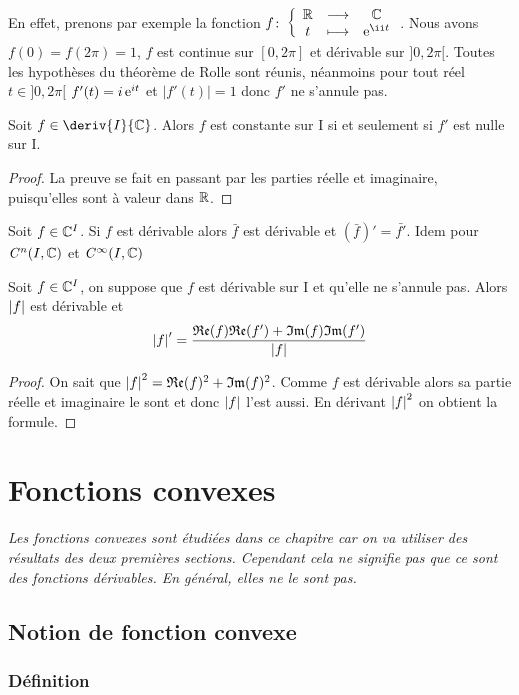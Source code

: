 En effet, prenons par exemple la fonction $\fonction{f}{\R}{\C}{t}{\e^{\ii t}}$. Nous avons $f(0)=f(2\pi)=1$, $f$ est continue sur $[0,2\pi]$ et dérivable sur $]0,2\pi[$. Toutes les hypothèses du théorème de Rolle sont réunis, néanmoins pour tout réel $t \in ]0,2\pi[$ $f'(t)=i \operatorname{e}^{it}$ et $|f'(t)|=1$ donc $f'$ ne s'annule pas.

\begin{theo}
  Soit $f \in \deriv{I}{\C}$. Alors $f$ est constante sur I si et seulement si $f'$ est nulle sur I.
\end{theo}
\begin{proof}
  La preuve se fait en passant par les parties réelle et imaginaire, puisqu'elles sont à valeur dans $\mathbb{R}$.
\end{proof}
\begin{prop}
  Soit $f \in \mathbb{C}^I$. Si $f$ est dérivable alors $\bar{f}$ est dérivable et $\left(\bar{f}\right)'=\bar{f'}$. Idem pour $\mathit{C}^n(I,\mathbb{C})$ et $\mathit{C}^\infty(I,\mathbb{C})$
\end{prop}
\begin{prop}
  Soit $f \in \mathbb{C}^I$, on suppose que $f$ est dérivable sur I et qu'elle ne s'annule pas. Alors $\left\lvert f\right\rvert$ est dérivable et
  \begin{equation}
    \left\lvert f\right\rvert'=\frac{\mathfrak{Re}(f)\mathfrak{Re}(f') + \mathfrak{Im}(f)\mathfrak{Im}(f')}{\left\lvert f\right\rvert}
  \end{equation}
\end{prop}
\begin{proof}
  On sait que $\left\lvert f\right\rvert^2=\mathfrak{Re}(f)^2+\mathfrak{Im}(f)^2$. Comme $f$ est dérivable alors sa partie réelle et imaginaire le sont et donc $\left\lvert f\right\rvert$ l'est aussi. En dérivant $\left\lvert f\right\rvert^2$ on obtient la formule.
\end{proof}

\section{Fonctions convexes}

\emph{Les fonctions convexes sont étudiées dans ce chapitre car on va utiliser des résultats des deux premières sections. Cependant cela ne signifie pas que ce sont des fonctions dérivables. En général, elles ne le sont pas.}

\subsection{Notion de fonction convexe}

\subsubsection{Définition}

